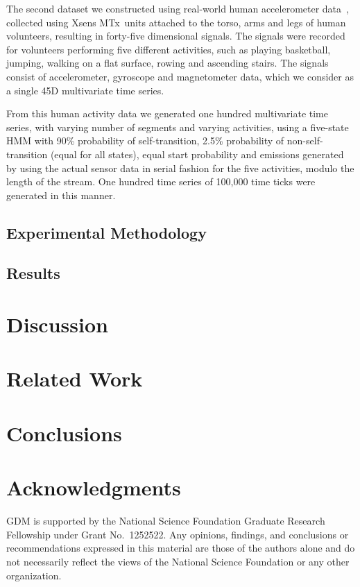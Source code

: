 \documentclass{article}
\begin{document}
The second dataset we constructed using real-world human accelerometer data~\cite{Altun:2010:CSC:1823245.1823314}, collected using Xsens MTx\texttrademark\ units attached to the torso, arms and legs of human volunteers, resulting in forty-five dimensional signals. The signals were recorded for volunteers performing five different activities, such as playing basketball, jumping, walking on a flat surface, rowing and ascending stairs. The signals consist of accelerometer, gyroscope and magnetometer data, which we consider as a single 45D multivariate time series. 

From this human activity data we generated one hundred multivariate time series, with varying number of segments and varying activities, using a five-state HMM with 90\% probability of self-transition, 2.5\% probability of non-self-transition (equal for all states), equal start probability and emissions generated by using the actual sensor data in serial fashion for the five activities, modulo the length of the stream. One hundred time series of 100,000 time ticks were generated in this manner.

\subsection{Experimental Methodology}

\subsection{Results}

\section{Discussion}

\section{Related Work}

\section{Conclusions}


\section*{Acknowledgments}
GDM is supported by the National Science Foundation Graduate Research Fellowship under Grant No.\ 1252522. 
Any opinions, findings, and conclusions or recommendations expressed in this material are those of the authors alone and do not necessarily
reflect the views of the National Science Foundation or any other organization.


\end{document}
